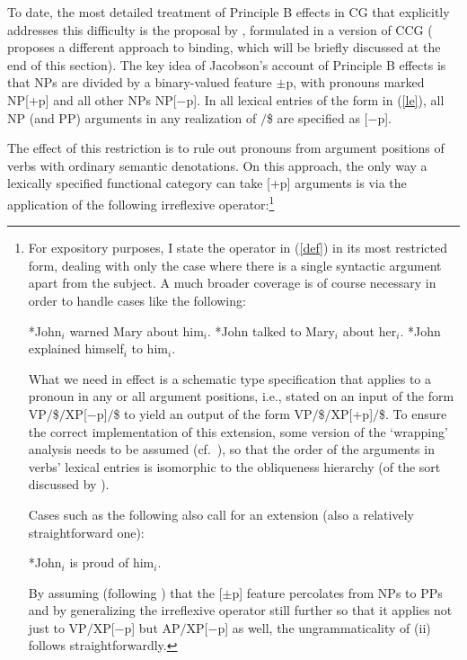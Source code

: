 \documentclass[output=paper]{langsci/langscibook}
\begin{document}
To date, the most detailed treatment of Principle B effects in CG that
explicitly addresses this difficulty is the proposal by
\citet{jacobson07}, formulated in a version of CCG
(\citet{Steedman97a} proposes a different approach to binding,
which will be briefly discussed at the end of this section). The key
idea of Jacobson's account of Principle B effects is that NPs are
divided by a binary-valued feature $\pm$p, with pronouns marked NP[+p]
and all other NPs NP[$-$p]. In all lexical entries of the form in
(\ref{le}), all NP (and PP) arguments in any realization of $/$\$ are
specified as [$-$p].

\begin{exe}
 \ex\label{le}
\end{exe}
The effect of this restriction is to rule out pronouns from argument
positions of verbs with ordinary semantic denotations. On this
approach, the only way a lexically specified functional category can
take [+p] arguments is via the application of the following
irreflexive operator:\footnote{For expository purposes, I state the
operator in (\ref{def}) in its most restricted form, dealing with only the
case where there is a single syntactic argument apart from the
subject. A much broader coverage is of course necessary in order to
handle cases like the following:

\begin{exe}
  \begin{xlist}
 \ex
    *John\ensuremath{_i} warned Mary about him\ensuremath{_i}.
 \ex
    *John talked to Mary\ensuremath{_i} about her\ensuremath{_i}.
 \ex
    *John explained himself\ensuremath{_i} to him\ensuremath{_i}.
  \end{xlist}
\end{exe}
What we need in effect is a schematic type specification that applies
to a pronoun in any or all argument positions, i.e., stated on an
input of the form VP\ensuremath{/}\$\ensuremath{/}XP[$-$p]\ensuremath{/}\$ to yield an output of 
the form VP\ensuremath{/}\$\ensuremath{/}XP[+p]\ensuremath{/}\$. To ensure the correct implementation
of this extension, some version of the `wrapping' analysis needs to be
assumed (cf.\ \citealt{jacobson07}), so that the order of the arguments in 
verbs' lexical entries is isomorphic to the obliqueness hierarchy (of
the sort discussed by \citet{PS92a}).

Cases such as the following also call for an extension (also a
relatively straightforward one):

\begin{exe}
  *John\ensuremath{_i} is proud of him\ensuremath{_i}.
\end{exe}
By assuming (following \citealt{jacobson07}) that the [$\pm$p] feature
percolates from NPs to PPs and by generalizing the irreflexive
operator still further so that it applies not just to VP\ensuremath{/}XP[$-$p] but
AP\ensuremath{/}XP[$-$p] as well, the ungrammaticality of (ii) follows
straightforwardly.}
\end{document}
